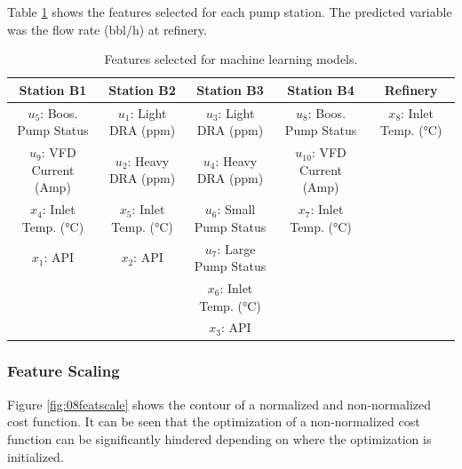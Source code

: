 Table \ref{tab:08featselect} shows the features selected for each pump station. The predicted variable was the flow rate (bbl/h) at refinery.
\begin{table}[h]
    \centering
    {\tiny
    {
    \begin{tabular}{ c | c | c | c | c}
        Station B1                       & Station B2                      & Station B3                        & Station B4                    & Refinery \\
        \hline
        $u_5$: Boos. Pump Status       &  $u_1$: Light DRA (ppm)  &  $u_3$: Light DRA (ppm)     &  $u_{8}$: Boos. Pump Status   &  $x_{8}$: Inlet Temp. (°C) \\
        
        $u_9$: VFD Current (Amp)       &  $u_2$: Heavy DRA (ppm)   &  $u_4$: Heavy DRA (ppm)      & $u_{10}$: VFD Current (Amp)      & \\
        
        $x_{4}$: Inlet Temp. (°C)     &  $x_{5}$: Inlet Temp. (°C) &  $u_6$: Small Pump Status &  $x_{7}$: Inlet Temp. (°C)  & \\
        
        $x_{1}$: API                   &  $x_{2}$: API          &  $u_7$: Large Pump Status   &             
        & \\
        
                                       &                          &  $x_{6}$: Inlet Temp. (°C)  &             
        & \\
        
                                       &                          &  $x_{3}$: API               &       
        & \\
        
    \end{tabular}}}
    \caption{Features selected for machine learning models.}
    \label{tab:08featselect}
\end{table}

\subsubsection{Feature Scaling}
Figure \ref{fig:08featscale} shows the contour of a normalized and non-normalized cost function. It can be seen that the optimization of a non-normalized cost function can be significantly hindered depending on where the optimization is initialized.

